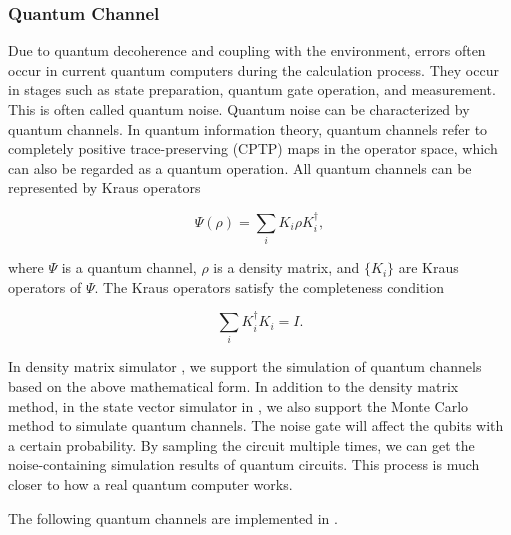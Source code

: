 \label{sec:noise_simulation}
\subsubsection{Quantum Channel}
Due to quantum decoherence and coupling with the environment, errors often occur in current quantum computers during the calculation process. They occur in stages such as state preparation, quantum gate operation, and measurement. This is often called quantum noise. Quantum noise can be characterized by quantum channels. In quantum information theory, quantum channels refer to completely positive trace-preserving (CPTP) maps in the operator space, which can also be regarded as a quantum operation. All quantum channels can be represented by Kraus operators

\begin{equation}
    \Psi(\rho) = \sum_i K_i \rho K_i^\dagger,
\end{equation}

where $\Psi$ is a quantum channel, $\rho$ is a density matrix, and $\{K_i\}$ are Kraus operators of $\Psi$. The Kraus operators satisfy the completeness condition

\begin{equation}
    \sum_i K_i^\dagger K_i = I.
\end{equation}

In density matrix simulator , we support the simulation of quantum channels based on the above mathematical form. In addition to the density matrix method, in the state vector simulator  in \MindQuantum, we also support the Monte Carlo method to simulate quantum channels. The noise gate will affect the qubits with a certain probability. By sampling the circuit multiple times, we can get the noise-containing simulation results of quantum circuits. This process is much closer to how a real quantum computer works.

The following quantum channels are implemented in \MindQuantum.

